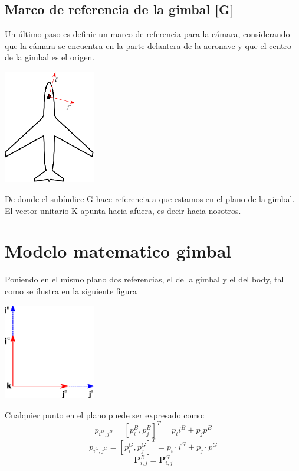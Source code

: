 \subsection{Marco de referencia de la gimbal [G]}
Un último paso es definir un marco de referencia para la cámara, considerando que la cámara se encuentra en la parte delantera de
la aeronave y que el centro de la gimbal es el origen.
\begin{center}
	\includegraphics[width=0.3\textwidth]{Contenido/Cuerpo/Capitulo3/Fig7.eps}
	\label{fig:ModeloMat:Fig1}
\end{center}
De donde el subíndice G hace referencia a que estamos en el plano de la gimbal. El vector unitario K apunta hacia afuera,
es decir hacia nosotros.


\section{Modelo matematico gimbal}
Poniendo en el mismo plano dos referencias, el de la gimbal y el del body, tal como se ilustra en la siguiente figura
\begin{center}
	\includegraphics[width=0.3\textwidth]{Contenido/Cuerpo/Capitulo3/Fig8.eps}
	\label{fig:ModeloMat:Fig1}
\end{center}
Cualquier punto en el plano puede ser expresado como:
\begin{equation}
	p_{i^B,j^B} = [p_i^B , p_j^B]^T = p_i i^B + p_j p^B
\end{equation}
\begin{equation}
	p_{i^G,j^G} = [p_i^G , p_j^G]^T = p_i \cdot i^G + p_j\cdot  p^G
\end{equation}
\begin{equation}
	\textbf{P}_{i,j}^B = \textbf{P}_{i,j}^G
\end{equation}

